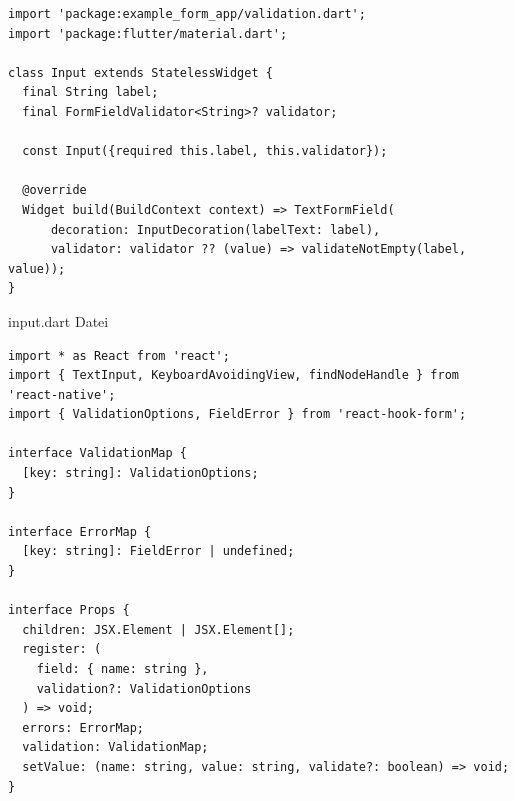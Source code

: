 \documentclass[11pt, twoside]{article}
\begin{document}
\begin{appendix}
\begin{listing}[H]
	\label{lst:quelltext4}

    \begin{verbatim}
import 'package:example_form_app/validation.dart';
import 'package:flutter/material.dart';

class Input extends StatelessWidget {
  final String label;
  final FormFieldValidator<String>? validator;

  const Input({required this.label, this.validator});

  @override
  Widget build(BuildContext context) => TextFormField(
	  decoration: InputDecoration(labelText: label),
	  validator: validator ?? (value) => validateNotEmpty(label, value));
}
    \end{verbatim}

    \caption[input.dart]{input.dart Datei}
\end{listing}













\begin{listing}[H]
	\label{lst:quelltext5}

    \begin{verbatim}
import * as React from 'react';
import { TextInput, KeyboardAvoidingView, findNodeHandle } from 'react-native';
import { ValidationOptions, FieldError } from 'react-hook-form';

interface ValidationMap {
  [key: string]: ValidationOptions;
}

interface ErrorMap {
  [key: string]: FieldError | undefined;
}

interface Props {
  children: JSX.Element | JSX.Element[];
  register: (
    field: { name: string },
    validation?: ValidationOptions
  ) => void;
  errors: ErrorMap;
  validation: ValidationMap;
  setValue: (name: string, value: string, validate?: boolean) => void;
}
\end{verbatim}



\end{listing}
\end{appendix}
\end{document}
